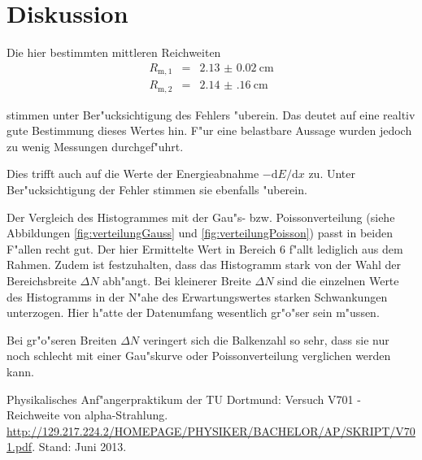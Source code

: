 \section{Diskussion}
\label{sec:diskussion}
	Die hier bestimmten mittleren Reichweiten 
	\begin{eqnarray*}
		R_\mathrm{m,1} & = & \SI{2.13(2)}{\centi \meter} \\	
		R_\mathrm{m,2} & = & \SI{2.14(16)}{\centi \meter}
	\end{eqnarray*}

	stimmen unter Ber"ucksichtigung des Fehlers "uberein.
	Das deutet auf eine realtiv gute Bestimmung dieses Wertes hin.
	F"ur eine belastbare Aussage wurden jedoch zu wenig Messungen durchgef"uhrt.

	Dies trifft auch auf die Werte der Energieabnahme $- \mathrm{d} E / \mathrm{d} x$ zu.
	Unter Ber"ucksichtigung der Fehler stimmen sie ebenfalls "uberein.

	Der Vergleich des Histogrammes mit der Gau"s- bzw. Poissonverteilung (siehe Abbildungen \ref{fig:verteilungGauss} und \ref{fig:verteilungPoisson}) passt in beiden F"allen recht gut.
	Der hier Ermittelte Wert in Bereich 6 f"allt lediglich aus dem Rahmen.
	Zudem ist festzuhalten, dass das Histogramm stark von der Wahl der Bereichsbreite $\Delta N$ abh"angt.
	Bei kleinerer Breite $\Delta N$ sind die einzelnen Werte des Histogramms in der N"ahe des Erwartungswertes starken Schwankungen unterzogen.
	Hier h"atte der Datenumfang wesentlich gr"o"ser sein m"ussen.

	Bei gr"o"seren Breiten $\Delta N$ veringert sich die Balkenzahl so sehr, dass sie nur noch schlecht mit einer Gau"skurve oder Poissonverteilung verglichen werden kann.

\begin{thebibliography}{9}
	 Physikalisches Anf"angerpraktikum der TU Dortmund: Versuch V701 - Reichweite von alpha-Strahlung. \url{http://129.217.224.2/HOMEPAGE/PHYSIKER/BACHELOR/AP/SKRIPT/V701.pdf}. Stand: Juni 2013.
\end{thebibliography}
